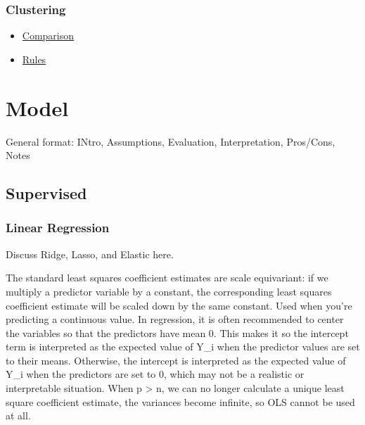 \documentclass[]{book}
\begin{document}
\subsection{Clustering}\label{clustering}

\begin{itemize}
\item
  \href{http://scikit-learn.org/stable/modules/clustering.html\#clustering}{Comparison}
\item
  \href{https://twitter.com/thomaswdinsmore/status/965223193043718145}{Rules}
\end{itemize}

\chapter{Model}\label{model-1}

General format: INtro, Assumptions, Evaluation, Interpretation,
Pros/Cons, Notes

\section{Supervised}\label{supervised}

\subsection{Linear Regression}\label{linear-regression}

Discuss Ridge, Lasso, and Elastic here.

The standard least squares coefficient estimates are scale equivariant:
if we multiply a predictor variable by a constant, the corresponding
least squares coefficient estimate will be scaled down by the same
constant. Used when you're predicting a continuous value. In regression,
it is often recommended to center the variables so that the predictors
have mean 0. This makes it so the intercept term is interpreted as the
expected value of Y\_i when the predictor values are set to their means.
Otherwise, the intercept is interpreted as the expected value of Y\_i
when the predictors are set to 0, which may not be a realistic or
interpretable situation. When p \textgreater{} n, we can no longer
calculate a unique least square coefficient estimate, the variances
become infinite, so OLS cannot be used at all.
\end{document}
